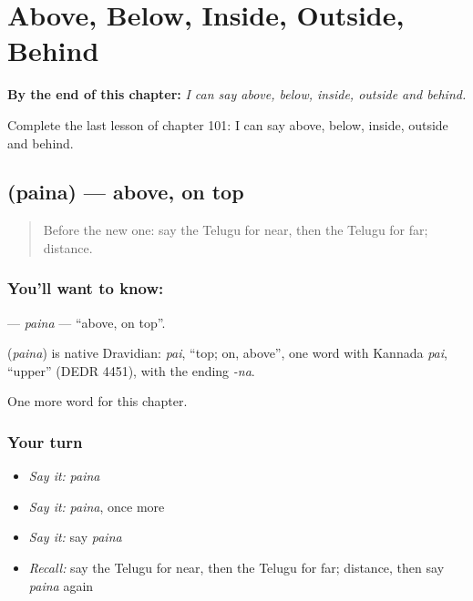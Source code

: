 
\chapter{Above, Below, Inside, Outside, Behind}
\label{ch:te-above-below-inside-outside-behind}

\begin{chapteropening}
\textbf{By the end of this chapter:} \emph{I can say above, below, inside, outside and behind.}

Complete the last lesson of chapter 101: I can say above, below, inside, outside and behind.
\end{chapteropening}

\section[\texorpdfstring{\te{పైన} (paina)}{పైన (paina)}]{ (paina) — above, on top}

\label{lesson:TE-C101-paina}



\begin{quote}
Before the new one: say the Telugu for near, then the Telugu for far; distance.
\end{quote}

\subsection*{You'll want to know: }
\textbf{} — \emph{paina} — \textquotedblleft{}above, on top\textquotedblright{}.

\begin{cousinweb}
\textbf{} (\emph{paina}) is native Dravidian: \emph{pai}, \textquotedblleft{}top; on, above\textquotedblright{}, one word with Kannada \emph{pai}, \textquotedblleft{}upper\textquotedblright{} (DEDR 4451), with the ending \emph{-na}.
\end{cousinweb}

\begin{grammarlens}[title={What you've built}]
One more word for this chapter.
\end{grammarlens}

\subsection*{Your turn}
\begin{itemize}
\raggedright
  \item \emph{Say it:} \emph{paina}
  \item \emph{Say it:} \emph{paina}, once more
  \item \emph{Say it:} say \emph{paina}
  \item \emph{Recall:} say the Telugu for near, then the Telugu for far; distance, then say \emph{paina} again
\end{itemize}

